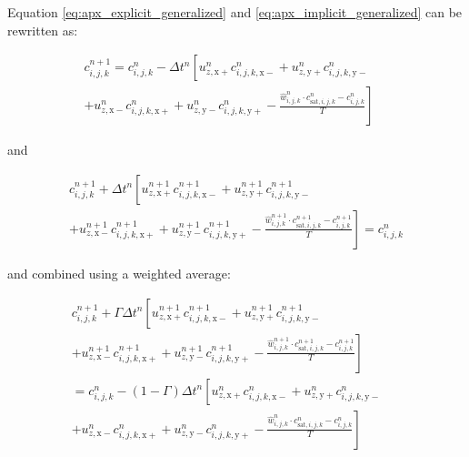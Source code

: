 \noindent Equation \ref{eq:apx_explicit_generalized} and
\ref{eq:apx_implicit_generalized} can be rewritten as:

\begin{multline}
  \label{eq:apx_explicit_rewritten}
  c^{n+1}_{i,j,k} = c^n_{i,j,k} - \Delta t^n \left[ 
  u^n_{z,\mathrm{x+}} c^n_{i,j,k,\mathrm{x-}} + 
  u^n_{z,\mathrm{y+}} c^n_{i,j,k,\mathrm{y-}} \phantom{\frac{c^n_{i,j,k}}{T}} \right. \\ + \left.
  u^n_{z,\mathrm{x-}} c^n_{i,j,k,\mathrm{x+}} + 
  u^n_{z,\mathrm{y-}} c^n_{i,j,k,\mathrm{y+}} -
  \frac{\hat{w}^n_{i,j,k} \cdot c^n_{\mathrm{sat},i,j,k} - c^n_{i,j,k}}{T} \right]
\end{multline}

\noindent and

\begin{multline}
  \label{eq:apx_implicit_rewritten}
  c^{n+1}_{i,j,k} + \Delta t^n \left[ 
  u^{n+1}_{z,\mathrm{x+}} c^{n+1}_{i,j,k,\mathrm{x-}} + 
  u^{n+1}_{z,\mathrm{y+}} c^{n+1}_{i,j,k,\mathrm{y-}} \phantom{\frac{c^{n+1}_{i,j,k}}{T}} \right. \\ + \left.
  u^{n+1}_{z,\mathrm{x-}} c^{n+1}_{i,j,k,\mathrm{x+}} + 
  u^{n+1}_{z,\mathrm{y-}} c^{n+1}_{i,j,k,\mathrm{y+}} -
  \frac{\hat{w}^{n+1}_{i,j,k} \cdot c^{n+1}_{\mathrm{sat},i,j,k} - c^{n+1}_{i,j,k}}{T} \right] = c^n_{i,j,k}
\end{multline}

\noindent and combined using a weighted average:

\begin{multline}
  \label{eq:apx_combined}
  c^{n+1}_{i,j,k} + \Gamma \Delta t^n \left[ 
  u^{n+1}_{z,\mathrm{x+}} c^{n+1}_{i,j,k,\mathrm{x-}} + 
  u^{n+1}_{z,\mathrm{y+}} c^{n+1}_{i,j,k,\mathrm{y-}} \phantom{\frac{c^{n+1}_{i,j,k}}{T}} \right. \\ + \left.
  u^{n+1}_{z,\mathrm{x-}} c^{n+1}_{i,j,k,\mathrm{x+}} + 
  u^{n+1}_{z,\mathrm{y-}} c^{n+1}_{i,j,k,\mathrm{y+}} -
  \frac{\hat{w}^{n+1}_{i,j,k} \cdot c^{n+1}_{\mathrm{sat},i,j,k} - c^{n+1}_{i,j,k}}{T} \right] \\ =
  c^n_{i,j,k} - (1 - \Gamma) \Delta t^n \left[ 
  u^n_{z,\mathrm{x+}} c^n_{i,j,k,\mathrm{x-}} + 
  u^n_{z,\mathrm{y+}} c^n_{i,j,k,\mathrm{y-}} \phantom{\frac{c^n_{i,j,k}}{T}} \right. \\ + \left.
  u^n_{z,\mathrm{x-}} c^n_{i,j,k,\mathrm{x+}} + 
  u^n_{z,\mathrm{y-}} c^n_{i,j,k,\mathrm{y+}} -
  \frac{\hat{w}^n_{i,j,k} \cdot c^n_{\mathrm{sat},i,j,k} - c^n_{i,j,k}}{T} \right]
\end{multline}

